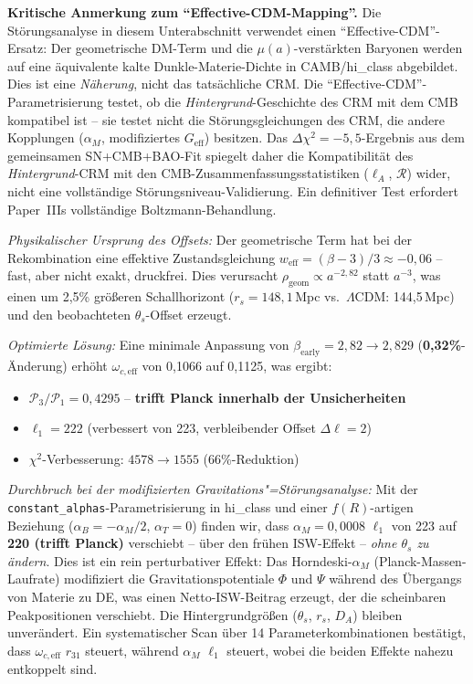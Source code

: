 \documentclass[aps,prd,twocolumn,superscriptaddress,nofootinbib,floatfix]{revtex4-2}
\begin{document}
\textbf{Kritische Anmerkung zum "`Effective-CDM-Mapping"'.} Die Störungsanalyse in diesem Unterabschnitt verwendet einen "`Effective-CDM"'-Ersatz: Der geometrische DM-Term und die $\mu(a)$-verstärkten Baryonen werden auf eine äquivalente kalte Dunkle-Materie-Dichte in CAMB/hi\_class abgebildet. Dies ist eine \emph{Näherung}, nicht das tatsächliche CRM. Die "`Effective-CDM"'-Parametrisierung testet, ob die \emph{Hintergrund}-Geschichte des CRM mit dem CMB kompatibel ist -- sie testet nicht die Störungsgleichungen des CRM, die andere Kopplungen ($\alpha_M$, modifiziertes $G_\mathrm{eff}$) besitzen. Das $\Delta\chi^2 = -5{,}5$-Ergebnis aus dem gemeinsamen SN+CMB+BAO-Fit spiegelt daher die Kompatibilität des \emph{Hintergrund}-CRM mit den CMB-Zusammenfassungsstatistiken ($\ell_A$, $\mathcal{R}$) wider, nicht eine vollständige Störungsniveau-Validierung. Ein definitiver Test erfordert Paper~IIIs vollständige Boltzmann-Behandlung.

\textit{Physikalischer Ursprung des Offsets:} Der geometrische Term hat bei der Rekombination eine effektive Zustandsgleichung $w_{\mathrm{eff}} = (\beta - 3)/3 \approx -0{,}06$ -- fast, aber nicht exakt, druckfrei. Dies verursacht $\rho_{\mathrm{geom}} \propto a^{-2{,}82}$ statt $a^{-3}$, was einen um 2,5\% größeren Schallhorizont ($r_s = 148{,}1$\,Mpc vs.\ $\Lambda$CDM: 144,5\,Mpc) und den beobachteten $\theta_s$-Offset erzeugt.

\textit{Optimierte Lösung:} Eine minimale Anpassung von $\beta_{\mathrm{early}} = 2{,}82 \to 2{,}829$ (\textbf{0,32\%}-Änderung) erhöht $\omega_{c,\mathrm{eff}}$ von 0,1066 auf 0,1125, was ergibt:
\begin{itemize}
\item $\mathcal{P}_3/\mathcal{P}_1 = 0{,}4295$ -- \textbf{trifft Planck innerhalb der Unsicherheiten}
\item $\ell_1 = 222$ (verbessert von 223, verbleibender Offset $\Delta\ell = 2$)
\item $\chi^2$-Verbesserung: $4578 \to 1555$ (66\%-Reduktion)
\end{itemize}

\textit{Durchbruch bei der modifizierten Gravitations"=Störungsanalyse:} Mit der \texttt{constant\_alphas}-Parametrisierung in hi\_class \cite{Zumalacarregui2017} und einer $f(R)$-artigen Beziehung ($\alpha_B = -\alpha_M/2$, $\alpha_T = 0$) finden wir, dass $\alpha_M = 0{,}0008$ $\ell_1$ von 223 auf \textbf{220 (trifft Planck)} verschiebt -- über den frühen ISW-Effekt -- \textit{ohne $\theta_s$ zu ändern}. Dies ist ein rein perturbativer Effekt: Das Horndeski-$\alpha_M$ (Planck-Massen-Laufrate) modifiziert die Gravitationspotentiale $\Phi$ und $\Psi$ während des Übergangs von Materie zu DE, was einen Netto-ISW-Beitrag erzeugt, der die scheinbaren Peakpositionen verschiebt. Die Hintergrundgrößen ($\theta_s$, $r_s$, $D_A$) bleiben unverändert. Ein systematischer Scan über 14 Parameterkombinationen bestätigt, dass $\omega_{c,\mathrm{eff}}$ $r_{31}$ steuert, während $\alpha_M$ $\ell_1$ steuert, wobei die beiden Effekte nahezu entkoppelt sind.
\end{document}
